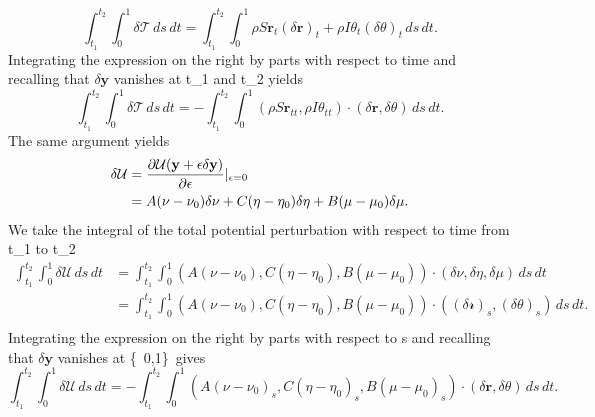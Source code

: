 \documentclass[12pt]{article}
\newcommand{\cB}{B}
\newcommand{\cA}{A}
\newcommand{\cC}{C}
\begin{document}
\[\int_{t_1}^{t_2} \int_{0}^{1} \delta \mathcal{T}\, ds \, dt = \int_{t_1}^{t_2} \int_{0}^{1} \rho S\mathbf{r}_t (\delta\mathbf{r})_t + \rho I \theta_t (\delta \theta)_t\, ds \, dt.
\]
Integrating the expression on the right by parts with respect to time and recalling that $\delta\mathbf{y}$ vanishes at t_1 and t_2  yields
\[\int_{t_1}^{t_2}\int_{0}^{1}\delta \mathcal{T}\,ds\,dt = -\int_{t_1}^{t_2}\int_{0}^{1}(\rho S\mathbf{r}_{tt}, \rho I\theta_{tt})\cdot(\delta\mathbf{r},\delta\theta)\,ds\,dt.
\]
The same argument yields
\begin{equation}
\begin{split}
 \delta\mathcal{U}& = \frac{\partial \mathcal{U}(\mathbf{y} + \epsilon\delta\mathbf{y})}{\partial{\epsilon}} \arrowvert_{\epsilon=0}\\
                  & = \cA(\nu-\nu_{0})\delta\nu+\cC(\eta-\eta_0)\delta\eta+\cB(\mu-\mu_0)\delta\mu.\\
\end{split}
\end{equation}
We take the integral of the total potential perturbation with respect to time from t_1 to t_2
\begin{equation}
\begin{split}
\int_{t_1}^{t_2}\int_{0}^{1}\delta\mathcal{U}\,ds\,dt 
                  & = \int_{t_1}^{t_2} \int_{0}^{1} 
(\cA(\nu-\nu_{0}),\cC(\eta-\eta_0),\cB(\mu-\mu_0))\cdot(\delta\nu,\delta\eta,\delta\mu)\,ds\,dt\\
                  & = \int_{t_1}^{t_2} \int_{0}^{1} 
(\cA(\nu-\nu_{0}),\cC(\eta-\eta_0),\cB(\mu-\mu_0))\cdot((\delta \mathcal{r})_s,(\delta\theta)_s)\,ds\,dt.\\
\end{split}
\end{equation}
Integrating the expression on the right by parts with respect to s and recalling that $\delta\mathbf{y}$ vanishes at \{\ 0,1\}\ gives
\[\int_{t_1}^{t_2}\int_{0}^{1}\delta\mathcal{U}\,ds\,dt =
-\int_{t_1}^{t_2} \int_{0}^{1} 
(\cA(\nu-\nu_{0})_s,\cC(\eta-\eta_0)_s,\cB(\mu-\mu_0)_s)\cdot(\delta\mathbf{r},\delta\theta)\,ds\,dt.
\]
\end{document}

